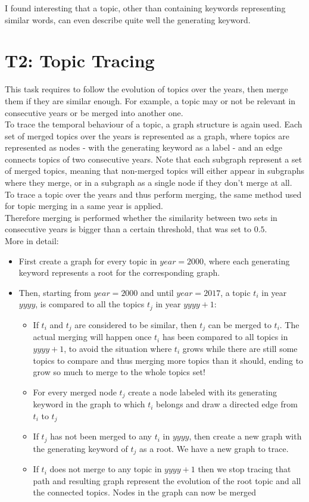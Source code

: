 \documentclass{article}
\begin{document}
I found interesting that a topic, other than containing keywords representing similar words, can even describe quite well the generating keyword.
\newpage

\section{T2: Topic Tracing}
This task requires to follow the evolution of topics over the years, then merge them if they are similar enough. For example, a topic may or not be relevant in consecutive years or be merged into another one.\\
To trace the temporal behaviour of a topic, a graph structure is again used.
Each set of merged topics over the years is represented as a graph, where topics are represented as nodes - with the generating keyword as a label - and an edge connects topics of two consecutive years.
Note that each subgraph represent a set of merged topics, meaning that non-merged topics will either appear in subgraphs where they merge, or in a subgraph as a single node if they don't merge at all.\\
To trace a topic over the years and thus perform merging, the same method used for topic merging in a same year is applied.\\
Therefore merging is performed whether the similarity between two sets in consecutive years is bigger than a certain threshold, that was set to $0.5$.\\
More in detail:\\
\begin{itemize}
	\item First create a graph for every topic in $year=2000$, where each generating keyword represents a root for the corresponding graph.
	\item Then, starting from $year=2000$ and until $year=2017$,
a topic $t_i$ in year $yyyy$, is compared to all the topics $t_j$ in year $yyyy+1$:
	\begin{itemize}
	\item If $t_i$ and $t_j$ are considered to be similar, then $t_j$ can be merged to $t_i$. The actual merging will happen once $t_i$ has been compared to all topics in $yyyy+1$, to avoid the situation where $t_i$ grows while there are still some topics to compare and thus merging more topics than it should, ending to grow so much to merge to the whole topics set!
	\item For every merged node $t_j$ create a node labeled with its generating keyword in the graph to which $t_i$ belongs and draw a directed edge from $t_i$ to $t_j$
	\item If $t_j$ has not been merged to any $t_i$ in $yyyy$, then create a new graph with the generating keyword of $t_j$ as a root. We have a new graph to trace.
	\item If $t_i$ does not merge to any topic in $yyyy+1$ then we stop tracing that path and resulting graph represent the evolution of the root topic and all the connected topics. Nodes in the graph can now be merged 
	\end{itemize}
\end{itemize}
\end{document}
